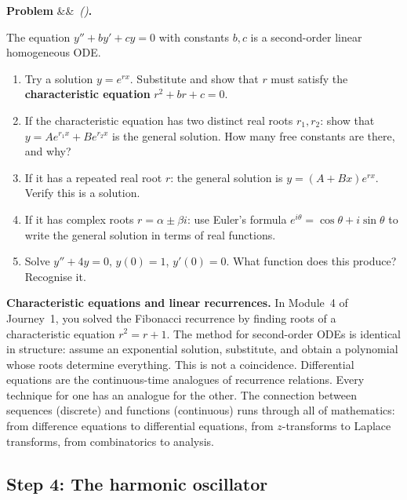 \documentclass[12pt, a4paper]{article}
\newcounter{problem}
\newenvironment{problem}[1][]{%
  \refstepcounter{problem}%
  \par\vspace{6pt}%
  \noindent\textbf{\color{MidBlue}Problem \theproblem}%
  \ifx&#1&\else\ \textit{(#1)}\fi\textbf{.}\enskip
}{\par\vspace{4pt}}
\begin{document}
\begin{problem}
\label{prob:second_order}
The equation $y'' + by' + cy = 0$ with constants $b, c$ is a second-order linear homogeneous ODE.

\begin{enumerate}[label=(\alph*), topsep=2pt]
  \item Try a solution $y = e^{rx}$. Substitute and show that $r$ must satisfy the \textbf{characteristic equation} $r^2 + br + c = 0$.
  \item If the characteristic equation has two distinct real roots $r_1, r_2$: show that $y = Ae^{r_1 x} + Be^{r_2 x}$ is the general solution. How many free constants are there, and why?
  \item If it has a repeated real root $r$: the general solution is $y = (A + Bx)e^{rx}$. Verify this is a solution.
  \item If it has complex roots $r = \alpha \pm \beta i$: use Euler's formula $e^{i\theta} = \cos\theta + i\sin\theta$ to write the general solution in terms of real functions.
  \item Solve $y'' + 4y = 0$, $y(0) = 1$, $y'(0) = 0$. What function does this produce? Recognise it.
\end{enumerate}
\end{problem}

\begin{thought}
\textbf{Characteristic equations and linear recurrences.}
In Module~4 of Journey~1, you solved the Fibonacci recurrence by finding roots of a characteristic equation $r^2 = r + 1$. The method for second-order ODEs is identical in structure: assume an exponential solution, substitute, and obtain a polynomial whose roots determine everything. This is not a coincidence. Differential equations are the continuous-time analogues of recurrence relations. Every technique for one has an analogue for the other. The connection between sequences (discrete) and functions (continuous) runs through all of mathematics: from difference equations to differential equations, from $z$-transforms to Laplace transforms, from combinatorics to analysis.
\end{thought}

\subsection{Step 4: The harmonic oscillator}
\end{document}
